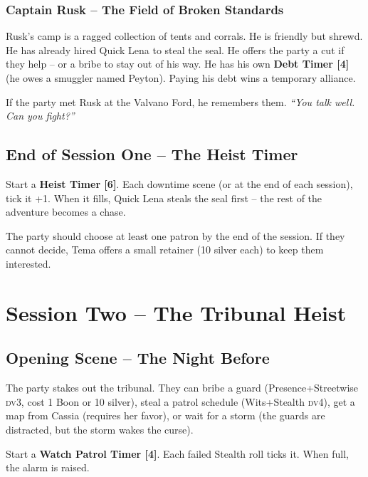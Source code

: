 \documentclass[10pt,twoside]{book}
\newcommand{\dv}{\textsc{dv}}
\begin{document}
\subsection{Captain Rusk -- The Field of Broken Standards}
Rusk's camp is a ragged collection of tents and corrals. He is friendly but shrewd. He has already hired Quick Lena to steal the seal. He offers the party a cut if they help -- or a bribe to stay out of his way. He has his own \textbf{Debt Timer [4]} (he owes a smuggler named Peyton). Paying his debt wins a temporary alliance.

If the party met Rusk at the Valvano Ford, he remembers them. \textit{``You talk well. Can you fight?''}

\section{End of Session One -- The Heist Timer }

Start a \textbf{Heist Timer [6]}. Each downtime scene (or at the end of each session), tick it +1. When it fills, Quick Lena steals the seal first -- the rest of the adventure becomes a chase.

The party should choose at least one patron by the end of the session. If they cannot decide, Tema offers a small retainer (10 silver each) to keep them interested.

\chapter{Session Two -- The Tribunal Heist}

\section{Opening Scene -- The Night Before}

The party stakes out the tribunal. They can bribe a guard (Presence+Streetwise \dv 3, cost 1 Boon or 10 silver), steal a patrol schedule (Wits+Stealth \dv 4), get a map from Cassia (requires her favor), or wait for a storm (the guards are distracted, but the storm wakes the curse).

Start a \textbf{Watch Patrol Timer [4]}. Each failed Stealth roll ticks it. When full, the alarm is raised.
\end{document}
